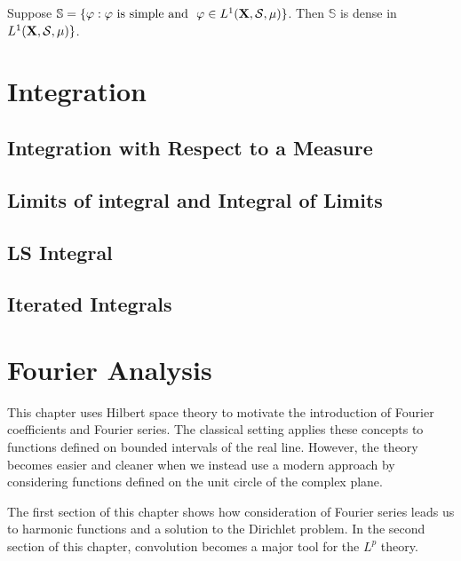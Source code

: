 \documentclass[12pt]{book}
\begin{document}
\begin{theorem}
Suppose $\mathbb{S}=\{\varphi: \varphi \ \text{is simple and } \ \varphi \in L^1(\X,\mathcal S,\mu) \}$. Then $\mathbb{S}$ is dense in $L^1(\mathbf{X},\mathcal S,\mu)\}$.
\end{theorem}







\chapter{Integration}
\section{Integration with Respect to a Measure}
\section{Limits of integral and Integral of Limits}
\section{LS Integral}
\section{Iterated Integrals}























\chapter{Fourier Analysis}
This chapter uses Hilbert space theory to motivate the introduction of Fourier coefficients and Fourier series. The classical setting applies these concepts to functions defined on bounded intervals of the real line. However, the theory becomes easier and cleaner when we instead use a modern approach by considering functions defined on the unit circle of the complex plane.

The first section of this chapter shows how consideration of Fourier series leads us to harmonic functions and a solution to the Dirichlet problem. In the second section of this chapter, convolution becomes a major tool for the $L^p$ theory.
\end{document}
